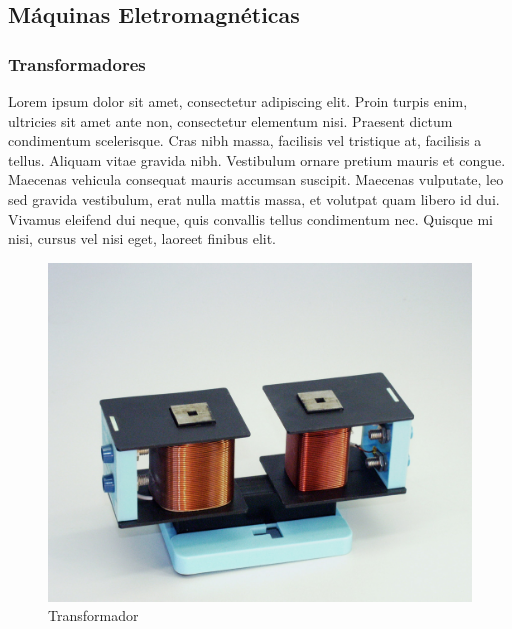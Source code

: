 \subsection{Máquinas Eletromagnéticas}
\subsubsection{Transformadores}
Lorem ipsum dolor sit amet, consectetur adipiscing elit. Proin turpis enim, ultricies sit amet ante non, consectetur elementum nisi. Praesent dictum condimentum scelerisque. Cras nibh massa, facilisis vel tristique at, facilisis a tellus. Aliquam vitae gravida nibh. Vestibulum ornare pretium mauris et congue. Maecenas vehicula consequat mauris accumsan suscipit. Maecenas vulputate, leo sed gravida vestibulum, erat nulla mattis massa, et volutpat quam libero id dui. Vivamus eleifend dui neque, quis convallis tellus condimentum nec. Quisque mi nisi, cursus vel nisi eget, laoreet finibus elit. 

\begin{figure}[!htb]
    \centering
    \includegraphics[scale=0.2]{Trafo_3.jpg}
    \caption{Transformador}
    \label{fig:trafo}
\end{figure}